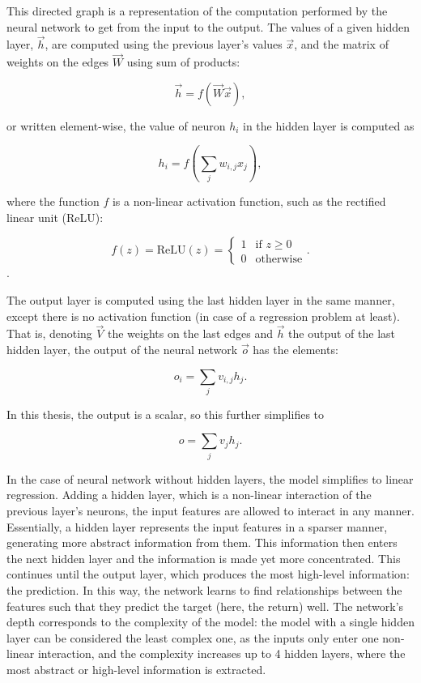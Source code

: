 		This directed graph is a representation of the computation performed by the neural network to get from the input to the output. The values of a given hidden layer, $\vec{h}$, are computed using the previous layer's values $\vec{x}$, and the matrix of weights on the edges $\vec{W}$ using sum of products: 
		
		\begin{equation}
			\label{eqn:hidden_layer}
			\vec{h} = f(\vec{W}\vec{x}),
		\end{equation}
		
		or written element-wise, the value of neuron $h_i$ in the hidden layer is computed as 
		
		\begin{equation*}
			h_i = f \left( \sum_{j}w_{i,j}x_j \right),
		\end{equation*}
		
		where the function $f$ is a non-linear activation function, such as the rectified linear unit (ReLU):
		
		\[
			f(z) = \text{ReLU}(z) =   
				\begin{cases}
					1 & \text{if } z \geq 0\\
					0 & \text{otherwise}
				\end{cases}.
		\]. 
		
		
		The output layer is computed using the last hidden layer in the same manner, except there is no activation function (in case of a regression problem at least). That is, denoting $\vec{V}$ the weights on the last edges and $\vec{h}$ the output of the last hidden layer, the output of the neural network $\vec{o}$ has the elements: 
		
		\begin{equation*}
			o_i = \sum_{j}v_{i,j} h_j.
		\end{equation*}
		
		In this thesis, the output is a scalar, so this further simplifies to 
		
		\begin{equation}
			o = \sum_{j}v_{j} h_j.
		\end{equation}
		
		In the case of neural network without hidden layers, the model simplifies to linear regression. Adding a hidden layer, which is a non-linear interaction of the previous layer's neurons, the input features are allowed to interact in any manner. Essentially, a hidden layer represents the input features in a sparser manner, generating more abstract information from them. This information then enters the next hidden layer and the information is made yet more concentrated. This continues until the output layer, which produces the most high-level information: the prediction. In this way, the network learns to find relationships between the features such that they predict the target (here, the return) well. The network's depth corresponds to the complexity of the model: the model with a single hidden layer can be considered the least complex one, as the inputs only enter one non-linear interaction, and the complexity increases up to 4 hidden layers, where the most abstract or high-level information is extracted.
		
